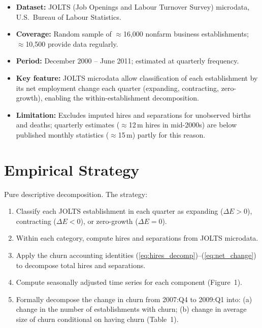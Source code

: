 \begin{itemize}
  \item \textbf{Dataset:} JOLTS (Job Openings and Labour Turnover Survey)
    microdata, U.S.\ Bureau of Labour Statistics.
  \item \textbf{Coverage:} Random sample of $\approx$16,000 nonfarm business
    establishments; $\approx$10,500 provide data regularly.
  \item \textbf{Period:} December 2000 -- June 2011; estimated at quarterly
    frequency.
  \item \textbf{Key feature:} JOLTS microdata allow classification of each
    establishment by its net employment change each quarter (expanding,
    contracting, zero-growth), enabling the within-establishment decomposition.
  \item \textbf{Limitation:} Excludes imputed hires and separations for
    unobserved births and deaths; quarterly estimates ($\approx$12\,m hires in
    mid-2000s) are below published monthly statistics ($\approx$15\,m) partly
    for this reason.
\end{itemize}

\section{Empirical Strategy}

Pure descriptive decomposition. The strategy:
\begin{enumerate}
  \item Classify each JOLTS establishment in each quarter as expanding
    ($\Delta E>0$), contracting ($\Delta E<0$), or zero-growth ($\Delta E=0$).
  \item Within each category, compute hires and separations from JOLTS
    microdata.
  \item Apply the churn accounting identities
    (\ref{eq:hires_decomp})--(\ref{eq:net_change}) to decompose total hires
    and separations.
  \item Compute seasonally adjusted time series for each component (Figure~1).
  \item Formally decompose the change in churn from 2007:Q4 to 2009:Q1 into:
    (a) change in the number of establishments with churn; (b) change in
    average size of churn conditional on having churn (Table~1).
\end{enumerate}

